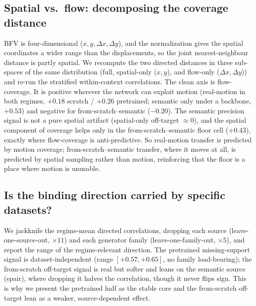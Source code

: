 \documentclass[runningheads]{llncs}
\begin{document}
\subsection{Spatial vs.\ flow: decomposing the coverage distance}
BFV is four-dimensional ($x,y,\Delta x,\Delta y$), and the normalization gives
the spatial coordinates a wider range than the displacements, so the joint
nearest-neighbour distance is partly spatial. We recompute the two directed
distances in three sub-spaces of the same distribution (full, spatial-only ($x,y$),
and flow-only ($\Delta x,\Delta y$)) and re-run the stratified within-context
correlations. The clean axis is flow-coverage. It is positive wherever the
network can exploit motion (real-motion in both regimes, $+0.18$ scratch /
$+0.26$ pretrained; semantic only under a backbone, $+0.53$) and negative for
from-scratch--semantic ($-0.20$). The semantic precision signal is not a pure
spatial artifact (spatial-only off-target $\approx0$), and the spatial component
of coverage helps only in the from-scratch--semantic floor cell ($+0.43$),
exactly where flow-coverage is anti-predictive. So real-motion transfer is
predicted by motion coverage; from-scratch--semantic transfer, where it moves at
all, is predicted by spatial sampling rather than motion, reinforcing that the
floor is a place where motion is unusable.

\subsection{Is the binding direction carried by specific datasets?}
We jackknife the regime-mean directed correlations, dropping each source
(leave-one-source-out, $\times 11$) and each generator family
(leave-one-family-out, $\times 5$), and report the range of the
regime-relevant direction. The pretrained missing-support signal is
dataset-independent (range $[{+}0.57,{+}0.65]$, no family load-bearing); the
from-scratch off-target signal is real but softer and leans on the semantic
source (spair), where dropping it halves the correlation, though it never flips
sign. This is why we present the pretrained half as the stable core and the
from-scratch off-target lean as a weaker, source-dependent effect.
\begin{table}[h]\centering\small
\resizebox{\linewidth}{!}{}
\caption{Per-regime source/family jackknife. ``Span'' is the spread of the
regime-relevant correlation over all 16 single drops.}
\label{tab:new_jackknife}
\end{table}
\end{document}

